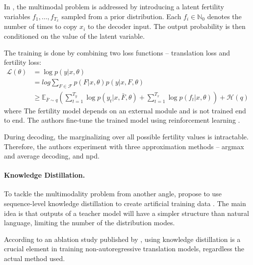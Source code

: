 In \citet{gu2017nonautoregressive}, the multimodal problem is addressed by
introducing a latent fertility variables $f_1, \ldots, f_{T_x}$ sampled from a
prior distribution. Each $f_i \in \mathbb{N}_0$ denotes the number of times to
copy $x_i$ to the decoder input. The output probability is then conditioned on
the value of the latent variable.

The training is done by combining two loss functions -- translation loss and
fertility loss:
\begin{align}
  \mathcal{L}(\theta)  & = \log p(y|x, \theta) \\
                       & = log \sum_{F \in \mathcal{F}} p(F| x, \theta ) p(y | x, F, \theta) \\
                       & \geq \mathbb{E}_{\bar{F} \sim q}
                         \left(
                         \sum_{t=1}^{T_y} \log p(y_t | x, \bar{F}, \theta)
                         + \sum_{t=1}^{T_x} \log p(f_t | x, \theta)
                         \right)
                         + \mathcal{H}(q)
\end{align}
%
where 
%
The fertility model depends on an external module and is not trained end to
end. The authors fine-tune the trained model using reinforcement learning
\citep{williams1992simple}.

During decoding, the marginalizing over all possible fertility values is
intractable. Therefore, the authors experiment with three approximation methods
-- argmax and average decoding, and \ac{npd}.

\paragraph{Knowledge Distillation.} To tackle the multimodality problem from
another angle, \citet{gu2017nonautoregressive} propose to use sequence-level
knowledge distillation to create artificial training data
\citep{kim-rush-2016-sequence}. The main idea is that outputs of a teacher
model will have a simpler structure than natural language, limiting the number
of the distribution modes.

According to an ablation study published by \citet{gu-kong-2021-fully}, using
knowledge distillation is a crucial element in training non-autoregressive
translation models, regardless the actual method used.


